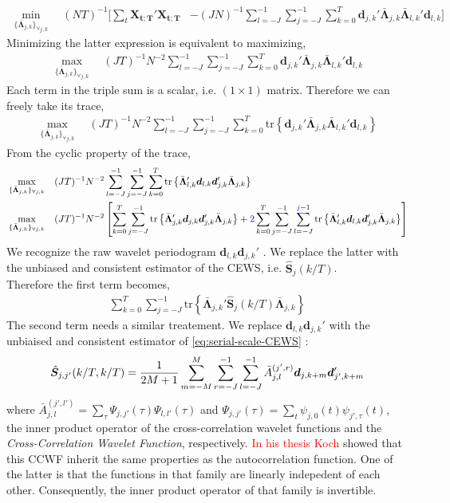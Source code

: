 \documentclass{article}
\numberwithin{equation}{section}
\let \oldsum \sum
\renewcommand{\sum}{\displaystyle \oldsum}
\newcommand{\X}[1]{\bm{X_{#1;T}}}
\newcommand{\wavelet}[3]{\psi_{#1,#2}(#3)}
\newcommand{\scalesum}{\sum_{j=-J}^{-1}}
\newcommand{\scalesumi}{\sum_{l=-J}^{-1}}
\newcommand{\locsum}{\sum_{k=0}^{T}}
\newcommand{\coeffs}[2]{\bm{d}_{#1,#2}}
\newcommand{\estimCEWS}[2]{\widehat{\bm{S}}_{#1}\left(#2/T\right)}
\newcommand{\optLoadings}[2]{\bar{\bm{\Lambda}}_{#1,#2}}
\newcommand{\setOptLoadings}{\{ \bar{\bm{\Lambda}}_{j,k} \}_{\forall j,k}}
\begin{document}
\begin{align*}
	\min_{\setOptLoadings} \quad (NT)^{-1} \Big[ \sum_t \X{t}'\X{t} &- (JN)^{-1}\scalesumi \scalesum \locsum \coeffs{j}{k}' \optLoadings{j}{k}\optLoadings{l}{k}' \coeffs{l}{k}\Big]
\end{align*}
Minimizing the latter expression is equivalent to maximizing, 
\begin{align*}
	\max_{\setOptLoadings} \quad (JT)^{-1}N^{-2}\scalesumi \scalesum \locsum \coeffs{j}{k}' \optLoadings{j}{k}\optLoadings{l}{k}' \coeffs{l}{k}
\end{align*}
Each term in the triple sum is a scalar, i.e. $(1 \times 1)$ matrix. Therefore we can freely take its trace, 
\begin{align*}
	\max_{\setOptLoadings} \quad (JT)^{-1}N^{-2}\scalesumi \scalesum \locsum \mathrm{tr} \left \{\coeffs{j}{k}' \optLoadings{j}{k}\optLoadings{l}{k}' \coeffs{l}{k}\right \}
\end{align*}
From the cyclic property of the trace, 
\begin{align*}
	&\max_{\setOptLoadings} \quad (JT)^{-1}N^{-2}\scalesumi \scalesum \locsum \mathrm{tr} \left \{\optLoadings{l}{k}' \coeffs{l}{k} \coeffs{j}{k}' \optLoadings{j}{k} \right \}\\
	&\max_{\setOptLoadings} \quad (JT)^{-1}N^{-2} \left[ \locsum \scalesum \mathrm{tr} \left \{\optLoadings{j}{k}' \coeffs{j}{k} \coeffs{j}{k}' \optLoadings{j}{k} \right \} + \textcolor{blue}{2} \locsum \scalesum \sum_{l=-J}^{\textcolor{blue}{j}-1} \mathrm{tr} \left \{\optLoadings{l}{k}' \coeffs{l}{k} \coeffs{j}{k}' \optLoadings{j}{k} \right \} \right]
\end{align*}
We recognize the raw wavelet periodogram $\coeffs{l}{k} \coeffs{j}{k}'$ . We replace the latter with the unbiased and consistent estimator of the CEWS, i.e. $\estimCEWS{j}{k}$. \\
Therefore the first term becomes, 
\begin{align*}
	\locsum \scalesum \mathrm{tr} \left \{\optLoadings{j}{k}' \estimCEWS{j}{k} \optLoadings{j}{k} \right \}
\end{align*}
The second term needs a similar treatement. We replace $\coeffs{l}{k} \coeffs{j}{k}'$ with the unbiaised and consistent estimator of \eqref{eq:serial-scale-CEWS} : 
\begin{align}
	\Hat{\bm{S}}_{j,j'}(k/T, k/T) = \frac{\displaystyle 1}{\displaystyle 2M+1} \sum_{m=-M}^{M}\sum_{r=-J}^{-1} \sum_{l=-J}^{-1} \bar{A}_{j,l}^{(j',r)} \coeffs{j}{k+m} \coeffs{j'}{k+m}'
\end{align}
where $\bar{A}_{j,l}^{(j',l')} = \sum_{\tau}\Psi_{j,j'}(\tau)\Psi_{l,l'}(\tau)$ and $\Psi_{j,j'}(\tau) = \sum_{t} \wavelet{j}{0}{t}\wavelet{j'}{\tau}{t}$, the inner product operator of the cross-correlation wavelet functions and the \emph{Cross-Correlation Wavelet Function}, respectively. \textcolor{red}{In his thesis Koch} showed that this CCWF inherit the same properties as the autocorrelation function. One of the latter is that the functions in that family are linearly indepedent of each other. Consequently, the inner product operator of that family is invertible.  \\
\end{document}
